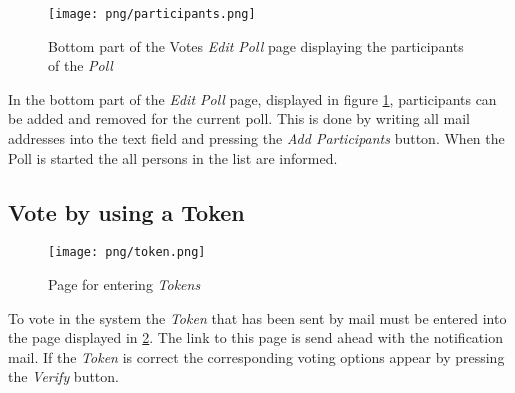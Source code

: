 \begin{figure}
\centering
\texttt{[image: png/participants.png]}
\caption{Bottom part of the Votes \textit{Edit Poll} page displaying the participants of the \textit{Poll}}
\label{F:participants}
\end{figure}

In the bottom part of the \textit{Edit Poll} page, displayed in figure \ref*{F:participants}, participants can be added and removed for the current poll. This is done by writing all mail addresses into the text field and pressing the \textit{Add Participants} button. When the Poll is started the all persons in the list are informed.

\subsection{Vote by using a Token}

\begin{figure}
\centering
\texttt{[image: png/token.png]}
\caption{Page for entering \textit{Tokens}}
\label{F:token}
\end{figure}

To vote in the system the \textit{Token} that has been sent by mail must be entered into the page displayed in \ref{F:token}. The link to this page is send ahead with the notification mail. If the \textit{Token} is correct the corresponding voting options appear by pressing the \textit{Verify} button.